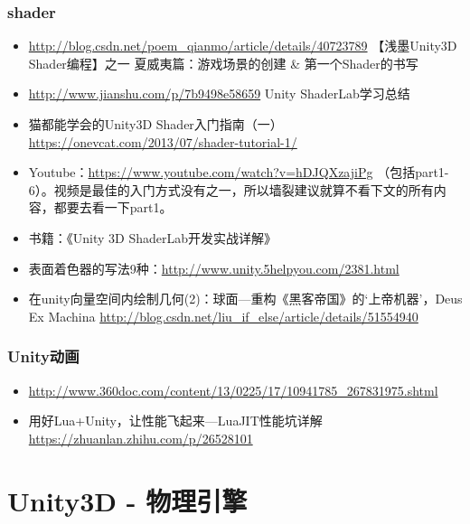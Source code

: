 \documentclass[9pt, b5paper]{article}
\begin{document}
\subsubsection{shader}
\label{sec:org08d3e94}
\begin{itemize}
\item \url{http://blog.csdn.net/poem\_qianmo/article/details/40723789} 【浅墨Unity3D Shader编程】之一 夏威夷篇：游戏场景的创建 \& 第一个Shader的书写
\item \url{http://www.jianshu.com/p/7b9498e58659} Unity ShaderLab学习总结
\item 猫都能学会的Unity3D Shader入门指南（一） \url{https://onevcat.com/2013/07/shader-tutorial-1/}
\item Youtube：\url{https://www.youtube.com/watch?v=hDJQXzajiPg} （包括part1-6）。视频是最佳的入门方式没有之一，所以墙裂建议就算不看下文的所有内容，都要去看一下part1。
\item 书籍：《Unity 3D ShaderLab开发实战详解》
\item 表面着色器的写法9种：\url{http://www.unity.5helpyou.com/2381.html}
\item 在unity向量空间内绘制几何(2)：球面---重构《黑客帝国》的‘上帝机器’，Deus Ex Machina \url{http://blog.csdn.net/liu\_if\_else/article/details/51554940}
\end{itemize}

\subsubsection{Unity动画}
\label{sec:orgbd32105}
\begin{itemize}
\item \url{http://www.360doc.com/content/13/0225/17/10941785\_267831975.shtml}
\item 用好Lua+Unity，让性能飞起来—LuaJIT性能坑详解 \url{https://zhuanlan.zhihu.com/p/26528101}
\end{itemize}
\section{Unity3D - 物理引擎}
\label{sec:orge2f2a38}
\end{document}
